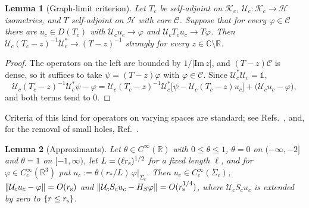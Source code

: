 \documentclass[%
 aip,
 jmp,
 amsmath,amssymb,
 reprint, onecolumn
]{revtex4-1}
\newtheorem{alemma}{Lemma}
\theoremstyle{definition}
\theoremstyle{remark}
\newcommand{\R}{\mathbb{R}}
\newcommand{\C}{\mathbb{C}}
\newcommand{\Hil}{\mathcal{H}}
\newcommand{\K}{\mathcal{K}}
\newcommand{\one}{\mathds{1}}
\begin{document}
\begin{alemma}[Graph-limit criterion]\label{lem:graph-limit}
Let $T_c$ be self-adjoint on $\K_c$, $\mathcal{U}_c:\K_c\to\Hil$
isometries, and $T$ self-adjoint on $\Hil$ with core $\mathcal C$.
Suppose that for every $\varphi\in\mathcal C$ there are $u_c\in D(T_c)$
with $\mathcal{U}_cu_c\to\varphi$ and $\mathcal{U}_cT_cu_c\to T\varphi$.
Then $\mathcal{U}_c(T_c-z)^{-1}\mathcal{U}_c^*\to(T-z)^{-1}$ strongly for
every $z\in\C\setminus\R$.
\end{alemma}

\begin{proof}
The operators on the left are bounded by $1/|\mathrm{Im}\,z|$, and
$(T-z)\mathcal C$ is dense, so it suffices to take $\psi=(T-z)\varphi$
with $\varphi\in\mathcal C$. Since $\mathcal{U}_c^*\mathcal{U}_c=\one$,
\[
\mathcal{U}_c(T_c-z)^{-1}\mathcal{U}_c^*\psi-\varphi=
\mathcal{U}_c(T_c-z)^{-1}\mathcal{U}_c^*\bigl[\psi-\mathcal{U}_c(T_c-z)u_c
\bigr]+\bigl(\mathcal{U}_cu_c-\varphi\bigr),
\]
and both terms tend to $0$.
\end{proof}

Criteria of this kind for operators on varying spaces are standard; see
Refs.~, and, for
the removal of small holes, Ref.~.

\begin{alemma}[Approximants]\label{lem:approximants}
Let $\theta\in C^\infty(\R)$ with $0\leq\theta\leq1$, $\theta=0$ on
$(-\infty,-2]$ and $\theta=1$ on $[-1,\infty)$, let $L=(\ell r_{\rm s})^{1/2}$ for a fixed
length $\ell$, and for $\varphi\in C_c^\infty(\R^3)$ put $u_c:=\theta(r_*/L)\,
\varphi|_{\Sigma_c}$. Then $u_c\in C_c^\infty(\Sigma_c)$,
$\|\mathcal{U}_cu_c-\varphi\|=O(r_{\rm s})$ and $\|\mathcal{U}_cS_cu_c-
H_S\varphi\|=O(r_{\rm s}^{1/4})$, where $\mathcal{U}_cS_cu_c$ is extended
by zero to $\{r\leq r_{\rm s}\}$.
\end{alemma}
\end{document}

